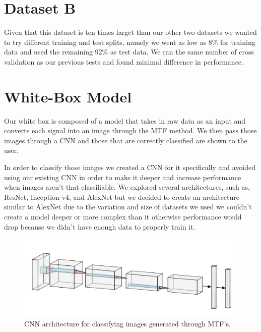 \documentclass{turabian-thesis}
\begin{document}
\section{Dataset B}

Given that this dataset is ten times larget than our other two datasets we wanted to try different training and test splits, namely we went as low as 8\% for training data and used the remaining 92\% as test data. We ran the same number of cross validation as our previous tests and found minimal difference in performance.



\section{White-Box Model}
Our white box is composed of a model that takes in raw data as an input and converts each signal into an image through the MTF method. We then pass those images through a CNN and those that are correctly classified are shown to the user.

In order to classify those images we created a CNN for it specifically and avoided using our existing CNN in order to make it deeper and increase performance when images aren’t that classifiable. We explored several architectures, such as, ResNet, Inception-v4, and AlexNet but we decided to create an architecture similar to AlexNet due to the variation and size of datasets we used we couldn’t create a model deeper or more complex than it otherwise performance would drop because we didn’t have enough data to properly train it.


\begin{figure}[h!]
   \begin{center}
      \includegraphics[scale=.7]{../media/alexnet.png}
   \end{center}
   \caption{CNN architecture for classifying images generated through MTF's.}
   \label{fig:mtf_cnn_results}
\end{figure}
\end{document}
